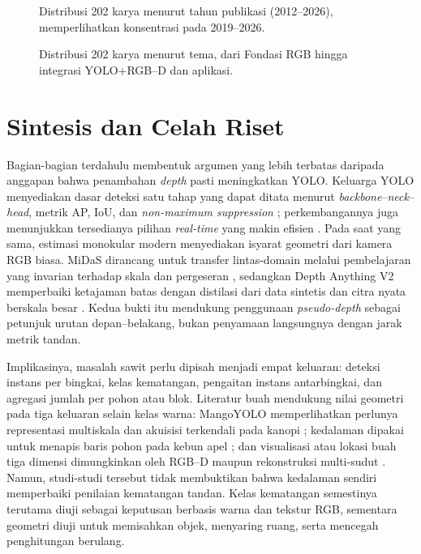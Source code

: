 \begin{figure}[t]
\centering
{}
\caption{Distribusi 202 karya menurut tahun publikasi (2012--2026),
memperlihatkan konsentrasi pada 2019--2026.}
\label{fig:chart-tahun}
\end{figure}

\begin{figure}[t]
\centering
{}
\caption{Distribusi 202 karya menurut tema, dari Fondasi RGB hingga
integrasi YOLO+RGB--D dan aplikasi.}
\label{fig:chart-tema}
\end{figure}


\section{Sintesis dan Celah Riset}\label{sec:sintesis}
Bagian-bagian terdahulu membentuk argumen yang lebih terbatas daripada
anggapan bahwa penambahan \textit{depth} pasti meningkatkan YOLO. Keluarga
YOLO menyediakan dasar deteksi satu tahap yang dapat ditata menurut
\textit{backbone}--\textit{neck}--\textit{head}, metrik AP, IoU, dan
\textit{non-maximum suppression} \cite{terven2023yolo}; perkembangannya juga
menunjukkan tersedianya pilihan \textit{real-time} yang makin efisien
\cite{sapkota2025yolo26}. Pada saat yang sama, estimasi monokular modern
menyediakan isyarat geometri dari kamera RGB biasa. MiDaS dirancang untuk
transfer lintas-domain melalui pembelajaran yang invarian terhadap skala dan
pergeseran \cite{ranftl2022midas}, sedangkan Depth Anything V2 memperbaiki
ketajaman batas dengan distilasi dari data sintetis dan citra nyata berskala
besar \cite{yang2024depthanythingv2}. Kedua bukti itu mendukung penggunaan
\textit{pseudo-depth} sebagai petunjuk urutan depan--belakang, bukan
penyamaan langsungnya dengan jarak metrik tandan.

Implikasinya, masalah sawit perlu dipisah menjadi empat keluaran: deteksi
instans per bingkai, kelas kematangan, pengaitan instans antarbingkai, dan
agregasi jumlah per pohon atau blok. Literatur buah mendukung nilai geometri
pada tiga keluaran selain kelas warna: MangoYOLO memperlihatkan perlunya
representasi multiskala dan akuisisi terkendali pada kanopi \cite{koirala2019deepfruit};
kedalaman dipakai untuk menapis baris pohon pada kebun apel \cite{fu2020apple};
dan visualisasi atau lokasi buah tiga dimensi dimungkinkan oleh RGB--D maupun
rekonstruksi multi-sudut \cite{kang2020strawberry,genemola2020fruit3d}. Namun,
studi-studi tersebut tidak membuktikan bahwa kedalaman sendiri memperbaiki
penilaian kematangan tandan. Kelas kematangan semestinya terutama diuji sebagai
keputusan berbasis warna dan tekstur RGB, sementara geometri diuji untuk
memisahkan objek, menyaring ruang, serta mencegah penghitungan berulang.

